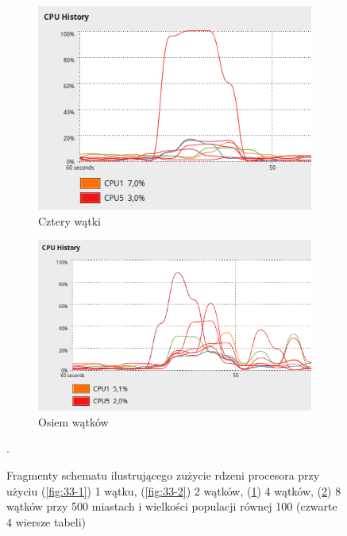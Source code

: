 \documentclass[10pt,a4paper]{article}
\begin{document}
\begin{figure}[H]
    \begin{subfigure}[b]{0.4\textwidth}
        \includegraphics[width=\textwidth]{33-4.png}
        \caption{Cztery wątki}
        \label{fig:33-4}
    \end{subfigure} 
    \begin{subfigure}[b]{0.4\textwidth}
            \includegraphics[width=\textwidth]{33-8.png}
            \caption{Osiem wątków}
            \label{fig:33-8}
    \end{subfigure}
    \caption{Fragmenty schematu ilustrującego zużycie rdzeni procesora przy użyciu (\ref{fig:33-1}) 1 wątku, (\ref{fig:33-2}) 2 wątków, (\ref{fig:33-4}) 4 wątków, (\ref{fig:33-8}) 8 wątków przy 500 miastach i wielkości populacji równej 100 (czwarte 4 wiersze tabeli)}\label{fig:31}. 
\end{figure}
\end{document}
